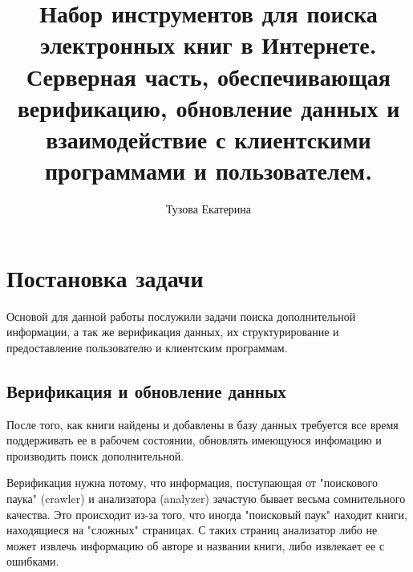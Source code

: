 \documentclass[a4paper, 12pt]{report}
\begin{document}
\author{Тузова Екатерина}
\title{Набор инструментов для поиска электронных книг в Интернете. Серверная часть, обеспечивающая верификацию, обновление данных и взаимодействие с клиентскими программами и пользователем.}

\maketitle


\newpage
\tableofcontents
\newpage






\section{Постановка задачи}

Основой для данной работы послужили задачи поиска дополнительной информации, а так же верификация данных, их структурирование  и предоставление пользователю и клиентским программам.


\subsection{Верификация и обновление данных}

После того, как книги найдены и добавлены в базу данных требуется все время поддерживать ее в рабочем состоянии, обновлять имеющуюся инфомацию и производить поиск дополнительной.

Верификация нужна потому, что информация, поступающая от "поискового паука" (crawler) и анализатора (analyzer) зачастую бывает весьма сомнительного качества. Это происходит из-за того, что иногда "поисковый паук" находит книги, находящиеся на "сложных" страницах. С таких страниц анализатор либо не может извлечь информацию об авторе и названии книги, либо извлекает ее с ошибками. 
\end{document}
